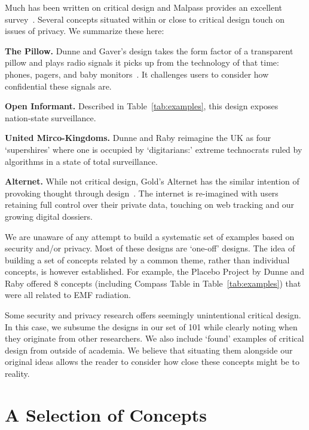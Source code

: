 Much has been written on critical design and Malpass provides an excellent survey~\cite{Mal17}. Several concepts situated within or close to critical design touch on issues of privacy. We summarize these here: 

\begin{compactlist}
\item \textbf{The Pillow.} Dunne and Gaver's design takes the form factor of a transparent pillow and plays radio signals it picks up from the technology of that time: \eg phones, pagers, and baby monitors~\cite{DuGa97}. It challenges users to consider how confidential these signals are.  
\item \textbf{Open Informant.} Described in Table~\ref{tab:examples}, this design exposes nation-state surveillance.
\item \textbf{United Mirco-Kingdoms.} Dunne and Raby reimagine the UK as four `supershires' where one is occupied by `digitarians:' extreme technocrats ruled by algorithms in a state of total surveillance.  
\item \textbf{Alternet.} While not critical design, Gold's Alternet has the similar intention of provoking thought through design~\cite{Gol14}. The internet is re-imagined with users retaining full control over their private data, touching on web tracking and our growing digital dossiers. 
\end{compactlist}

We are unaware of any attempt to build a systematic set of examples based on security and/or privacy. Most of these designs are `one-off' designs. The idea of building a set of concepts related by a common theme, rather than individual concepts, is however established. For example, the Placebo Project by Dunne and Raby offered 8 concepts  (including Compass Table in Table~\ref{tab:examples}) that were all related to EMF radiation. 

Some security and privacy research offers seemingly unintentional critical design. In this case, we subsume the designs in our set of 101 while clearly noting when they originate from other researchers. We also include `found' examples of critical design from outside of academia. We believe that situating them alongside our original ideas allows the reader to consider how close these concepts might be to reality. 

\section{A Selection of Concepts}

